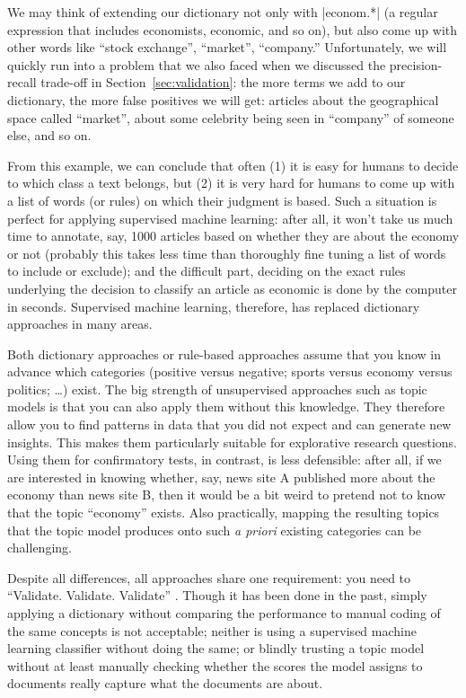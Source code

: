 We may think of extending our dictionary not only with |econom.*| (a
regular expression that includes economists, economic, and so on), but
also come up with other words like ``stock exchange'', ``market'',
``company.'' Unfortunately, we will quickly run into a problem that we also
faced when we discussed the precision-recall trade-off in
Section~\ref{sec:validation}: the more terms we add to our
dictionary, the more false positives we will get: articles about
the geographical space called ``market'', about some celebrity being seen
in ``company'' of someone else, and so on.

From this example, we can conclude that often (1) it is easy for
humans to decide to which class a text belongs, but (2) it is very
hard for humans to come up with a list of words (or rules) on which
their judgment is based.  Such a situation is perfect for applying
supervised machine learning: after all, it won't take us much time to
annotate, say, 1000 articles based on whether they are about the
economy or not (probably this takes less time than thoroughly
fine tuning a list of words to include or exclude); and the difficult part,
deciding on the exact rules underlying the decision to classify an
article as economic is done by the computer in seconds. Supervised
machine learning, therefore, has replaced dictionary approaches in
many areas.

Both dictionary approaches or rule-based approaches assume that you
know in advance which categories (positive versus negative; sports
versus economy versus politics; \ldots) exist. The big strength of unsupervised
approaches such as topic models is that you can also apply them 
without this knowledge. They therefore allow you to find patterns
in data that you did not expect and can generate new insights. This
makes them particularly suitable for explorative research questions.
Using them for confirmatory tests, in contrast, is less defensible:
after all, if we are interested in knowing whether, say, news site A
published more about the economy than news site B, then it would be
a bit weird to pretend not to know that the topic ``economy'' exists.
Also practically, mapping the resulting topics that the topic model
produces onto such \emph{a priori} existing categories can be challenging.

Despite all differences, all approaches share one requirement: you
need to ``Validate. Validate. Validate'' \citep{Grimmer2013}. Though
it has been done in the past, simply applying a dictionary without
comparing the performance to manual coding of the same concepts
is not acceptable; neither is using a supervised machine learning
classifier without doing the same; or blindly trusting a topic model
without at least manually checking whether the scores the model assigns
to documents really capture what the documents are about.


